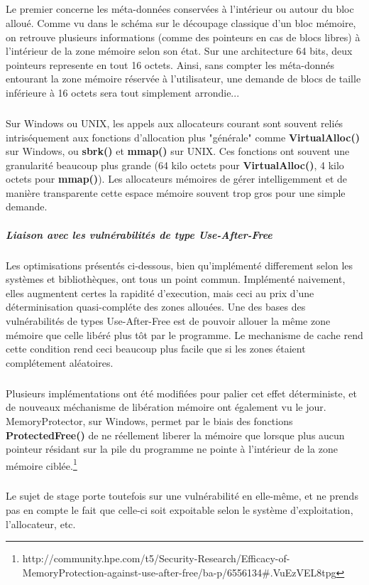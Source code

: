 \subparagraph{}
Le premier concerne les méta-données conservées à l'intérieur ou autour du bloc alloué. Comme vu dans le schéma sur le découpage classique d'un bloc mémoire,
on retrouve plusieurs informations (comme des pointeurs en cas de blocs libres) à l'intérieur de la zone mémoire selon son état. Sur une architecture 64 bits,
deux pointeurs represente en tout 16 octets. Ainsi, sans compter les méta-donnés entourant la zone mémoire réservée à l'utilisateur, une demande de blocs de taille
inférieure à 16 octets sera tout simplement arrondie...
\subparagraph{}
Sur Windows ou UNIX, les appels aux allocateurs courant sont souvent reliés intriséquement aux fonctions d'allocation plus "générale" comme  \textbf{VirtualAlloc()} sur
Windows, ou \textbf{sbrk()} et \textbf{mmap()} sur UNIX. Ces fonctions ont souvent une granularité beaucoup plus grande (64 kilo octets pour \textbf{VirtualAlloc()}, 4 kilo octets
pour \textbf{mmap()}). Les allocateurs mémoires de gérer intelligemment et de manière transparente cette espace mémoire souvent trop gros pour une simple demande.

\subparagraph{Liaison avec les vulnérabilités de type Use-After-Free}
Les optimisations présentés ci-dessous, bien qu'implémenté differement selon les systèmes et bibliothèques, ont tous un point commun.
Implémenté naivement, elles augmentent certes la rapidité d'execution, mais ceci au prix d'une déterminisation quasi-compléte des zones allouées.
Une des bases des vulnérabilités de types Use-After-Free est de pouvoir allouer la même zone mémoire que celle libéré plus tôt par le programme.
Le mechanisme de cache rend cette condition rend ceci beaucoup plus facile que si les zones étaient complétement aléatoires.

\subparagraph{}
Plusieurs implémentations ont été modifiées pour palier cet effet déterministe, et de nouveaux méchanisme de libération mémoire ont également vu le jour.
MemoryProtector, sur Windows, permet par le biais des fonctions \textbf{ProtectedFree()} de ne réellement liberer la mémoire que lorsque plus aucun pointeur
résidant sur la pile du programme ne pointe à l'intérieur de la zone mémoire ciblée.\footnote{http://community.hpe.com/t5/Security-Research/Efficacy-of-MemoryProtection-against-use-after-free/ba-p/6556134\#.VuEzVEL8tpg}


\subparagraph{}
Le sujet de stage porte toutefois sur une vulnérabilité en elle-même, et ne prends pas en compte le fait que celle-ci soit expoitable selon
le système d'exploitation, l'allocateur, etc.

